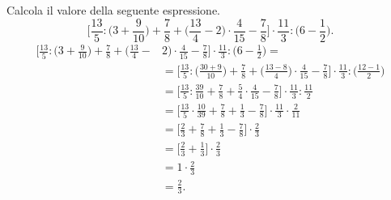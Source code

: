 \begin{esempio}
  Calcola il valore della seguente espressione.
\[\bigg[\frac{13}{5}:\bigg(3+\frac{9}{10}\bigg)+\frac{7}{8}+\bigg(\frac{13}{4}-2\bigg)\cdot\frac{4}{15}-\frac{7}{8}%
\bigg]\cdot\frac{11}{3}:\bigg(6-\frac{1}{2}\bigg).\]
  \begin{align*}
\bigg[\frac{13}{5}:\bigg(3+\frac{9}{10}\bigg)+\frac{7}{8}+\bigg(\frac{13}{4}-&2\bigg)\cdot\frac{4}{15}-\frac{7}{8}%
\bigg]\cdot\frac{11}{3}:\bigg(6-\frac{1}{2}\bigg)=\\
&=
\bigg[\frac{13}{5}:\bigg(\frac{30+9}{10}\bigg)+\frac{7}{8}+\bigg(\frac{13-8}{4}\bigg)\cdot\frac{4}{15}-\frac{7}{8}%
\bigg]\cdot\frac{11}{3}:\bigg(\frac{12-1}{2}\bigg)\\
 &=
\bigg[\frac{13}{5}:\frac{39}{10}+\frac{7}{8}+\frac{5}{4}\cdot\frac{4}{15}-\frac{7}{8}%
\bigg]\cdot\frac{11}{3}:\frac{11}{2}\\
 &=
\bigg[\frac{13}{5}\cdot\frac{10}{39}+\frac{7}{8}+\frac{1}{3}-\frac{7}{8}%
\bigg]\cdot\frac{11}{3}\cdot\frac{2}{11}\\
 &=
\bigg[\frac{2}{3}+\frac{7}{8}+\frac{1}{3}-\frac{7}{8}%
\bigg]\cdot\frac{2}{3}\\
 &=
\bigg[\frac{2}{3}+\frac{1}{3}\bigg]\cdot\frac{2}{3}\\
&=1\cdot\frac{2}{3}\\
&=\frac{2}{3}.
  \end{align*}
\end{esempio}
\pagebreak
